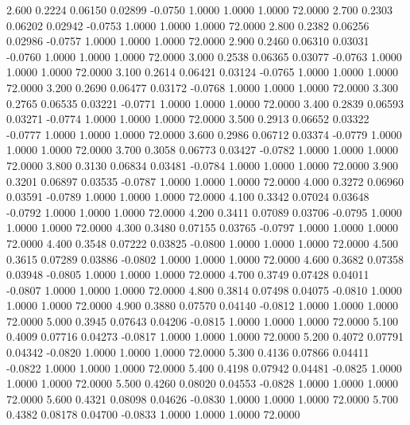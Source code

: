    2.600   0.2224   0.06150   0.02899  -0.0750   1.0000   1.0000   1.0000  72.0000
   2.700   0.2303   0.06202   0.02942  -0.0753   1.0000   1.0000   1.0000  72.0000
   2.800   0.2382   0.06256   0.02986  -0.0757   1.0000   1.0000   1.0000  72.0000
   2.900   0.2460   0.06310   0.03031  -0.0760   1.0000   1.0000   1.0000  72.0000
   3.000   0.2538   0.06365   0.03077  -0.0763   1.0000   1.0000   1.0000  72.0000
   3.100   0.2614   0.06421   0.03124  -0.0765   1.0000   1.0000   1.0000  72.0000
   3.200   0.2690   0.06477   0.03172  -0.0768   1.0000   1.0000   1.0000  72.0000
   3.300   0.2765   0.06535   0.03221  -0.0771   1.0000   1.0000   1.0000  72.0000
   3.400   0.2839   0.06593   0.03271  -0.0774   1.0000   1.0000   1.0000  72.0000
   3.500   0.2913   0.06652   0.03322  -0.0777   1.0000   1.0000   1.0000  72.0000
   3.600   0.2986   0.06712   0.03374  -0.0779   1.0000   1.0000   1.0000  72.0000
   3.700   0.3058   0.06773   0.03427  -0.0782   1.0000   1.0000   1.0000  72.0000
   3.800   0.3130   0.06834   0.03481  -0.0784   1.0000   1.0000   1.0000  72.0000
   3.900   0.3201   0.06897   0.03535  -0.0787   1.0000   1.0000   1.0000  72.0000
   4.000   0.3272   0.06960   0.03591  -0.0789   1.0000   1.0000   1.0000  72.0000
   4.100   0.3342   0.07024   0.03648  -0.0792   1.0000   1.0000   1.0000  72.0000
   4.200   0.3411   0.07089   0.03706  -0.0795   1.0000   1.0000   1.0000  72.0000
   4.300   0.3480   0.07155   0.03765  -0.0797   1.0000   1.0000   1.0000  72.0000
   4.400   0.3548   0.07222   0.03825  -0.0800   1.0000   1.0000   1.0000  72.0000
   4.500   0.3615   0.07289   0.03886  -0.0802   1.0000   1.0000   1.0000  72.0000
   4.600   0.3682   0.07358   0.03948  -0.0805   1.0000   1.0000   1.0000  72.0000
   4.700   0.3749   0.07428   0.04011  -0.0807   1.0000   1.0000   1.0000  72.0000
   4.800   0.3814   0.07498   0.04075  -0.0810   1.0000   1.0000   1.0000  72.0000
   4.900   0.3880   0.07570   0.04140  -0.0812   1.0000   1.0000   1.0000  72.0000
   5.000   0.3945   0.07643   0.04206  -0.0815   1.0000   1.0000   1.0000  72.0000
   5.100   0.4009   0.07716   0.04273  -0.0817   1.0000   1.0000   1.0000  72.0000
   5.200   0.4072   0.07791   0.04342  -0.0820   1.0000   1.0000   1.0000  72.0000
   5.300   0.4136   0.07866   0.04411  -0.0822   1.0000   1.0000   1.0000  72.0000
   5.400   0.4198   0.07942   0.04481  -0.0825   1.0000   1.0000   1.0000  72.0000
   5.500   0.4260   0.08020   0.04553  -0.0828   1.0000   1.0000   1.0000  72.0000
   5.600   0.4321   0.08098   0.04626  -0.0830   1.0000   1.0000   1.0000  72.0000
   5.700   0.4382   0.08178   0.04700  -0.0833   1.0000   1.0000   1.0000  72.0000
